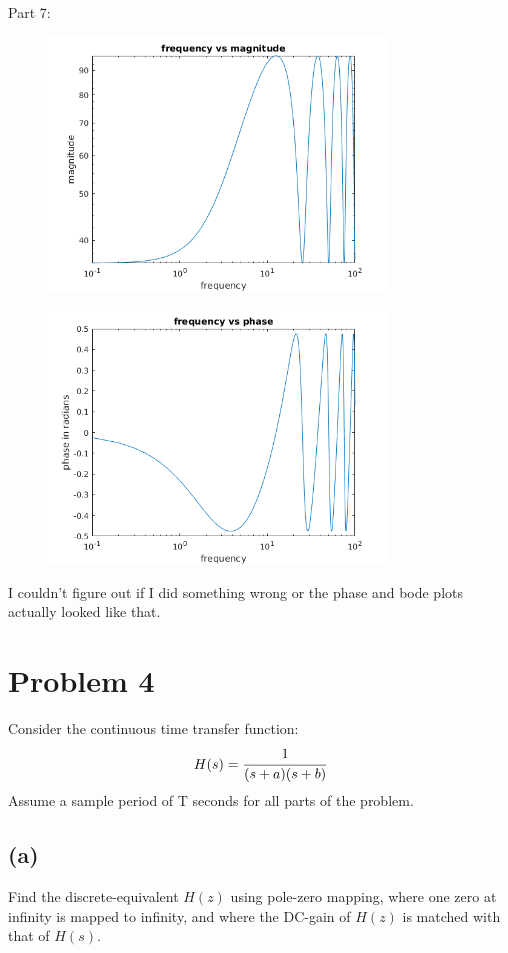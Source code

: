 \documentclass{article}
\begin{document}
Part 7:
\begin{figure}[H]
    \centering
    \includegraphics[width=0.8\textwidth]{PR3_7amp.png}
\end{figure}
\begin{figure}[H]
    \centering
    \includegraphics[width=0.8\textwidth]{PR3_7phase.png}
\end{figure}

I couldn't figure out if I did something wrong or the phase and bode plots actually looked like that.

\section*{Problem 4}
Consider the continuous time transfer function:
\[H(s)=\cfrac{1}{(s+a)(s+b)}\]
Assume a sample period of T seconds for all parts of the problem.
\subsection*{(a)}
Find the discrete-equivalent $H(z)$ using pole-zero mapping, where one zero at infinity is mapped to infinity, and where the DC-gain of $H(z)$ is matched with that of $H(s)$.\\
\end{document}
